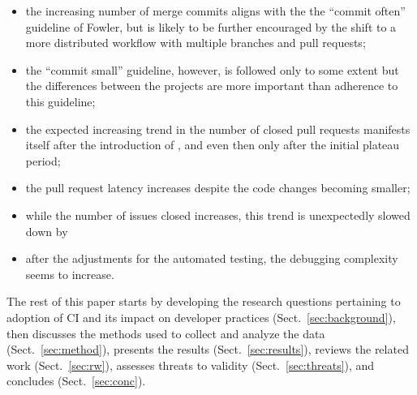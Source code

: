 \begin{itemize}

\item the increasing number of merge commits aligns with the the ``commit often'' guideline of Fowler, but is likely to be further encouraged by the shift to a more distributed workflow with multiple branches and pull requests;
\item the ``commit small'' guideline, however, is followed only to some extent but the differences between the projects are more important than adherence to this guideline;
\item the expected increasing trend in the number of closed pull requests manifests itself after the introduction of \Tvis, and even then only after the initial plateau period;
\item the pull request latency increases  despite the code changes becoming smaller;
\item while the number of issues closed increases, this trend is unexpectedly slowed down by \Tvis
\item after the adjustments for the automated testing, the debugging complexity seems to increase.
\end{itemize}


The rest of this paper starts by developing the research questions 
pertaining to adoption of CI and its impact on developer practices 
(Sect.~\ref{sec:background}), then discusses the methods used to collect 
and analyze the data (Sect.~\ref{sec:method}), presents the results 
(Sect.~\ref{sec:results}), reviews the related work (Sect.~\ref{sec:rw}),
assesses threats to validity (Sect.~\ref{sec:threats}), and concludes 
(Sect.~\ref{sec:conc}).




